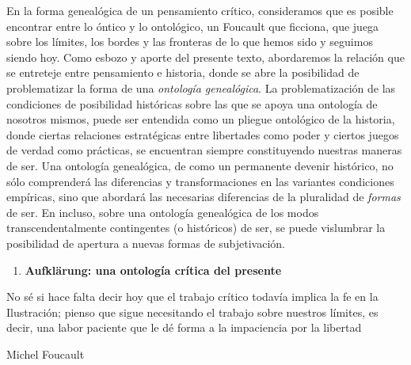 En la forma genealógica de un pensamiento crítico, consideramos que es posible encontrar entre lo óntico y lo ontológico, un Foucault que ficciona, que juega sobre los límites, los bordes y las fronteras de lo que hemos sido y seguimos siendo hoy. Como esbozo y aporte del presente texto, abordaremos la relación que se entreteje entre pensamiento e historia, donde se abre la posibilidad de problematizar la forma de una \emph{ontología genealógica}. La problematización de las condiciones de posibilidad históricas sobre las que se apoya una ontología de nosotros mismos, puede ser entendida como un pliegue ontológico de la historia, donde ciertas relaciones estratégicas entre libertades como poder y ciertos juegos de verdad como prácticas, se encuentran siempre constituyendo nuestras maneras de ser. Una ontología genealógica, de como un permanente devenir histórico, no sólo comprenderá las diferencias y transformaciones en las variantes condiciones empíricas, sino que abordará las necesarias diferencias de la pluralidad de \emph{formas} de ser. En incluso, sobre una ontología genealógica de los modos transcendentalmente contingentes (o históricos) de ser, se puede vislumbrar la posibilidad de apertura a nuevas formas de subjetivación.

\begin{enumerate}
\def\labelenumi{\arabic{enumi}.}
\item
  \textbf{Aufklärung: una ontología crítica del presente}
\end{enumerate}

No sé si hace falta decir hoy que el trabajo crítico todavía implica la fe en la Ilustración; pienso que sigue necesitando el trabajo sobre nuestros límites, es decir, una labor paciente que le dé forma a la impaciencia por la libertad

Michel Foucault

